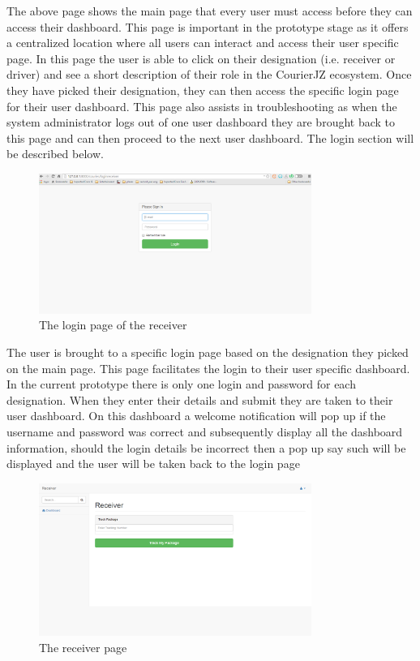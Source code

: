 \documentclass[paper=a4, fontsize=11pt]{scrartcl} %
\numberwithin{equation}{section} %
\numberwithin{figure}{section} %
\numberwithin{table}{section} %
\begin{document}
The above page shows the main page that every user must access before they can access their dashboard. This page is important in the prototype stage as it offers a centralized location where all users can interact and access their user specific page. In this page the user is able to click on their designation (i.e. receiver or driver) and see a short description of their role in the CourierJZ ecosystem. Once they have picked their designation, they can then access the specific login page for their user dashboard. This page also assists in troubleshooting as when the system administrator logs out of one user dashboard they are brought back to this page and can then proceed to the next user dashboard. The login section will be described below.

\begin{figure}[hbt!]
\centering
\includegraphics[width=3.5in]{pictures/loginreceiver_page.png}
\caption{The login page of the receiver}
\label{LoginReceiverPage}
\end{figure}

The user is brought to a specific login page based on the designation they picked on the main page. This page facilitates the login to their user specific dashboard. In the current prototype there is only one login and password for each designation.  When they enter their details and submit they are taken to their user dashboard. On this dashboard a welcome notification will pop up if the username and password was correct and subsequently display all the dashboard information, should the login details be incorrect then a pop up say such will be displayed and the user will be taken back to the login page

\begin{figure}[hbt!]
\centering
\includegraphics[width=3.5in]{pictures/receiver_page.png}
\caption{The receiver page}
\label{ReceiverPage}
\end{figure}
\end{document}
